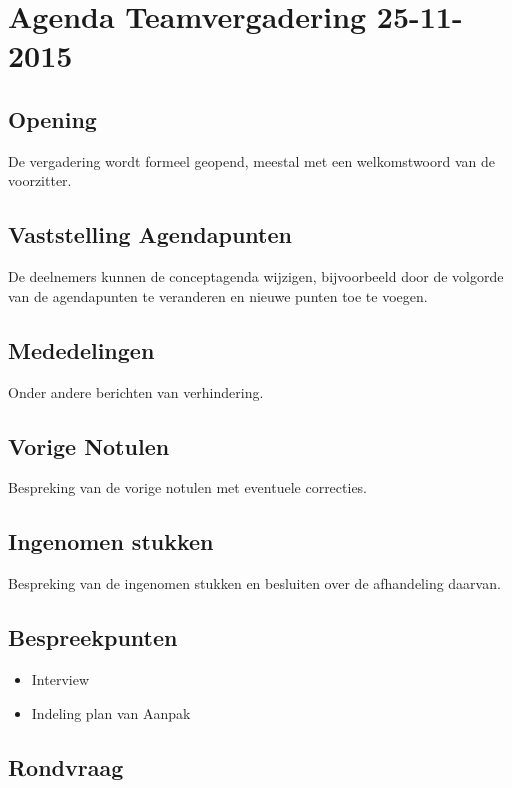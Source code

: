 \documentclass[dutch]{hu}
\date{25 november 2015}
\subtitle{Agenda Teamvergadering \vergaderingDatum}
\def \vergaderingDatum{25-11-2015}
\begin{document}
\maketitle
\chapter{Agenda Teamvergadering \vergaderingDatum}
\section{Opening}
De vergadering wordt formeel geopend, meestal met een welkomstwoord van de voorzitter.

\section{Vaststelling Agendapunten}
De deelnemers kunnen de conceptagenda wijzigen, bijvoorbeeld door de volgorde van de agendapunten te veranderen en nieuwe punten toe te voegen.

\section{Mededelingen}
Onder andere berichten van verhindering.

\section{Vorige Notulen}
Bespreking van de vorige notulen met eventuele correcties.

\section{Ingenomen stukken}
Bespreking van de ingenomen stukken en besluiten over de afhandeling daarvan.

\section{Bespreekpunten}
\begin{itemize}
\item Interview
\item Indeling plan van Aanpak
\end{itemize}

\section{Rondvraag}
\end{document}
